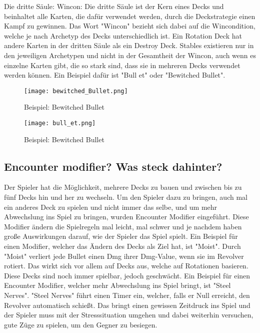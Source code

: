 Die dritte Säule: Wincon:
Die dritte Säule ist der Kern eines Decks und beinhaltet alle Karten, die dafür verwendet werden, durch die Deckstrategie einen Kampf zu gewinnen.
Das Wort "Wincon" bezieht sich dabei auf die Wincondition, welche je nach Archetyp des Decks unterschiedlich ist.
Ein Rotation Deck hat andere Karten in der dritten Säule als ein Destroy Deck. Stables existieren nur in den jeweiligen Archetypen
und nicht in der Gesamtheit der Wincon, auch wenn es einzelne Karten gibt, die so stark sind, dass sie in mehreren Decks verwendet werden können.
Ein Beispiel dafür ist "Bull et" oder "Bewitched Bullet".

\begin{figure}[H]
    \texttt{[image: bewitched\_Bullet.png]}
    \caption{Beispiel: Bewitched Bullet}
\end{figure}

\begin{figure}[H]
    \texttt{[image: bull\_et.png]}
    \caption{Beispiel: Bewitched Bullet}
\end{figure}

\subsection{Encounter modifier? Was steck dahinter?}\label{subsec:placementMatters}

Der Spieler hat die Möglichkeit, mehrere Decks zu bauen und zwischen bis zu fünf Decks hin und her zu wechseln.
Um den Spieler dazu zu bringen, auch mal ein anderes Deck zu spielen und nicht immer das selbe, und um mehr
Abwechslung ins Spiel zu bringen, wurden Encounter Modifier eingeführt.
Diese Modifier ändern die Spielregeln mal leicht, mal schwer und je nachdem haben große Auswirkungen darauf, wie der Spieler das Spiel spielt.
Ein Beispiel für einen Modifier, welcher das Ändern des Decks als Ziel hat, ist "Moist". Durch "Moist" verliert jede Bullet einen Dmg ihrer Dmg-Value,
wenn sie im Revolver rotiert.
Das wirkt sich vor allem auf Decks aus, welche auf Rotationen basieren. Diese Decks sind noch immer spielbar, jedoch geschwächt.
Ein Beispiel für einen Encounter Modifier, welcher mehr Abwechslung ins Spiel bringt, ist "Steel Nerves". "Steel Nerves" führt
einen Timer ein, welcher, falls er Null erreicht, den Revolver automatisch schießt. Das bringt einen gewissen Zeitdruck
ins Spiel und der Spieler muss mit der Stresssituation umgehen und dabei weiterhin versuchen, gute Züge zu spielen, um den Gegner zu besiegen. %

